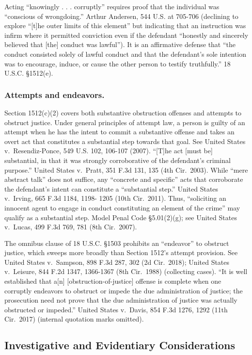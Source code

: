 Acting “knowingly . . . corruptly” requires proof that the individual was “conscious of wrongdoing.”
Arthur Andersen, 544 U.S. at 705-706 (declining to explore “[t]he outer limits of this element” but indicating that an instruction was infirm where it permitted conviction even if the defendant “honestly and sincerely believed that [the] conduct was lawful”).
It is an affirmative defense that “the conduct consisted solely of lawful conduct and that the defendant’s sole intention was to encourage, induce, or cause the other person to testify truthfully.”
18 U.S.C. \S 1512(e).

\subsubsection*{Attempts and endeavors.}
Section 1512(c)(2) covers both substantive obstruction offenses and attempts to obstruct justice. Under general principles of attempt law, a person is guilty of an attempt when he has the intent to commit a substantive offense and takes an overt act that constitutes a substantial step towards that goal.
See United States v.\ Resendiz-Ponce, 549 U.S. 102, 106-107 (2007).
“[T]he act [must be] substantial, in that it was strongly corroborative of the defendant’s criminal purpose.”
United States v.\ Pratt, 351 F.3d 131, 135 (4th Cir.~2003).
While “mere abstract talk” does not suffice, any “concrete and specific” acts that corroborate the defendant’s intent can constitute a “substantial step.”
United States v.\ Irving, 665 F.3d 1184, 1198- 1205 (10th Cir.~2011).
Thus, “soliciting an innocent agent to engage in conduct constituting an element of the crime” may qualify as a substantial step.
Model Penal Code \S 5.01(2)(g);
see United States v.\ Lucas, 499 F.3d 769, 781 (8th Cir.~2007).

The omnibus clause of 18 U.S.C. \S 1503 prohibits an “endeavor” to obstruct justice, which sweeps more broadly than Section 1512’s attempt provision.
See United States v.\ Sampson, 898 F.3d 287, 302 (2d Cir.~2018);
United States v.\ Leisure, 844 F.2d 1347, 1366-1367 (8th Cir.~1988) (collecting cases).
“It is well established that a[n] [obstruction-of-justice] offense is complete when one corruptly endeavors to obstruct or impede the due administration of justice;
the prosecution need not prove that the due administration of justice was actually obstructed or impeded.”
United States v.\ Davis, 854 F.3d 1276, 1292 (11th Cir.~2017) (internal quotation marks omitted).

\subsection{Investigative and Evidentiary Considerations}

